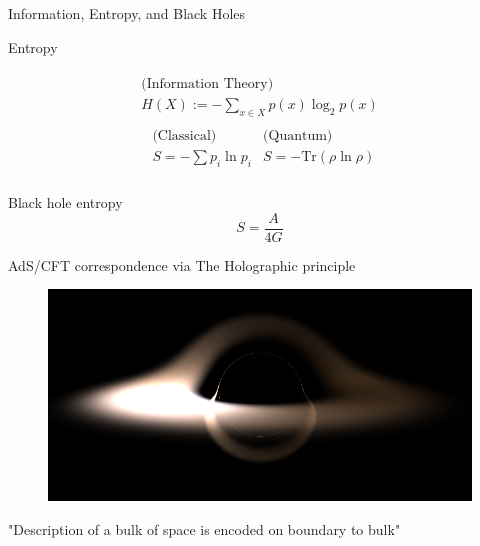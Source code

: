 \documentclass{beamer}
\begin{document}
\begin{frame}{Information, Entropy, and Black Holes}

Entropy

\[
\begin{gathered}
\begin{gathered}
\text{(Information Theory)} \\
H(X) := -\sum_{x \in X} p(x) \log_2{p(x)} 
\end{gathered} \\
\begin{aligned} 
 & \text{(Classical)} & \text{(Quantum)} \\
& S = - \sum p_i \ln{ p_i} & S = -\text{Tr}{ (\rho \ln{ \rho } )} \\
\end{aligned}
\end{gathered}
\]

Black hole entropy
\begin{equation*}
S = \frac{A}{4 G }
\end{equation*}

\end{frame}

\begin{frame}{AdS/CFT correspondence via The Holographic principle}

		\begin{figure}
	\includegraphics[width=\textwidth]{images/RelativisticAberationSageManifoldsindex.png}
\end{figure}

"Description of a bulk of space is encoded on boundary to bulk"


\end{frame}
\end{document}
